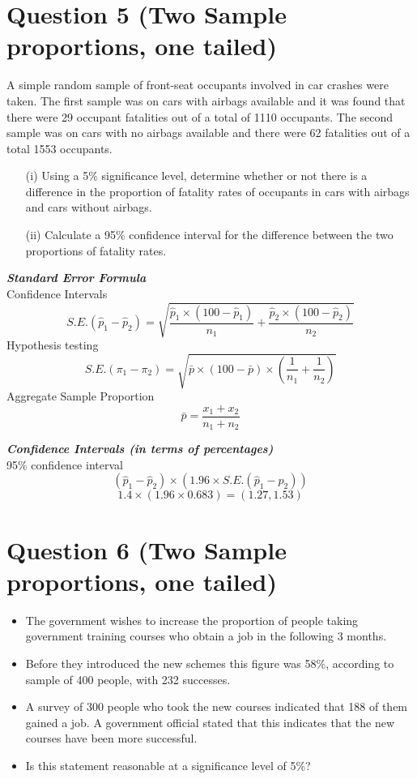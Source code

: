 \documentclass[a4paper,12pt]{article}
\begin{document}
\section*{Question 5 (Two Sample proportions, one tailed)}

A simple random sample of front-seat occupants involved in car crashes were taken. 
The first sample was on cars with airbags available and it was found that there were 29 occupant fatalities out of a total of 1110 occupants. The second sample was on cars with no airbags available and
there were 62 fatalities out of a total 1553 occupants.
\begin{itemize}
\item[(i)] Using a 5\% significance level, determine whether or not there is a difference in the proportion of fatality rates of occupants in cars with airbags and cars without airbags.
\item[(ii)] Calculate a 95\% confidence interval for the difference between the two proportions of fatality rates.
\end{itemize}

\noindent \textbf{\textit{Standard Error Formula }}\\
Confidence Intervals
\[ S.E.(\hat{p}_1 - \hat{p}_2)  = \sqrt{\frac{\hat{p}_1 \times (100 - \hat{p}_1)}{n_1} + \frac{\hat{p}_2 \times (100 - \hat{p}_2)}{n_2}} \]
Hypothesis testing
\[ S.E.(\pi_1 - \pi_2)  = \sqrt{\bar{p} \times (100 - \bar{p}) \times \left( \frac{1}{n_1} + \frac{1}{n_2}\right)} \]
Aggregate Sample Proportion
\[  \bar{p} = \frac{x_1+x_2}{n_1+n_2} \]


\noindent \textbf{\textit{Confidence Intervals (in terms of percentages) }}\\
95\% confidence interval
\[ (\hat{p}_1 - \hat{p}_2 ) \times (1.96 \times S.E.(\hat{p}_1 - \hat{p}_2))\]
\[ 1.4 \times (1.96 \times 0.683) =  (1.27,1.53)\]
\section*{Question 6 (Two Sample proportions, one tailed)}
\begin{itemize}
\item The government wishes to increase the proportion of people taking government training courses who obtain a job in the following 3 months. \item Before they introduced the new schemes this figure was 58\%, according to sample of 400 people, with 232 successes. \item A survey of 300 people who took the new courses indicated that 188 of them gained a job. A government official stated that this indicates that the new courses have been more successful. \item Is this statement reasonable at a significance level of 5\%?
\end{itemize}
\end{document}
